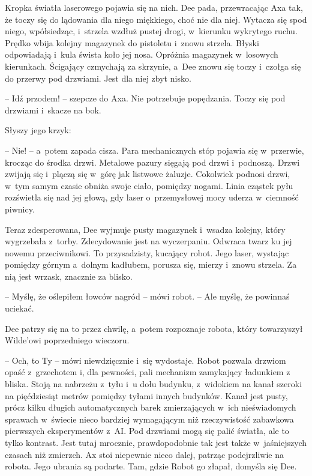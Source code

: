 \documentclass[oneside,polish,11pt,sfheadings]{mwbk}
\begin{document}
Kropka światła laserowego pojawia się na nich. Dee pada, przewracając
Axa tak, że toczy się do lądowania dla niego miękkiego, choć nie dla
niej. Wytacza się spod niego, wpółsiedząc, i~strzela wzdłuż pustej
drogi, w~kierunku wykrytego ruchu. Prędko wbija kolejny magazynek do
pistoletu i~znowu strzela. Błyski odpowiadają i~kula śwista koło jej
nosa. Opróżnia magazynek w~losowych kierunkach. Ścigający czmychają za
skrzynie, a~Dee znowu się toczy i~czołga się do przerwy pod drzwiami.
Jest dla niej zbyt nisko.

-- Idź przodem! -- szepcze do Axa. Nie potrzebuje popędzania. Toczy się
pod drzwiami i~skacze na bok.

Słyszy jego krzyk: 

-- Nie! -- a~potem zapada cisza. Para mechanicznych
stóp pojawia się w~przerwie, krocząc do środka drzwi. Metalowe pazury
sięgają pod drzwi i~podnoszą. Drzwi zwijają się i~plączą się w~górę jak
listwowe żaluzje. Cokolwiek podnosi drzwi, w~tym samym czasie obniża
swoje ciało, pomiędzy nogami. Linia cząstek pyłu rozświetla się nad jej
głową, gdy laser o~przemysłowej mocy uderza w~ciemność piwnicy.

Teraz zdesperowana, Dee wyjmuje pusty magazynek i~wsadza kolejny, który
wygrzebała z~torby. Zdecydowanie jest na wyczerpaniu. Odwraca twarz ku
jej nowemu przeciwnikowi. To przysadzisty, kucający robot. Jego laser,
wystając pomiędzy górnym a~dolnym kadłubem, porusza się, mierzy i~znowu
strzela. Za nią jest wrzask, znacznie za blisko.

-- Myślę, że oślepiłem łowców nagród -- mówi robot. -- Ale myślę, że
powinnaś uciekać.

Dee patrzy się na to przez chwilę, a~potem rozpoznaje robota, który
towarzyszył Wilde'owi poprzedniego wieczoru.

-- Och, to Ty -- mówi niewdzięcznie i~się wydostaje. Robot pozwala drzwiom
opaść z~grzechotem i, dla pewności, pali mechanizm zamykający ładunkiem
z bliska. Stoją na nabrzeżu z~tyłu i~u dołu budynku, z~widokiem na kanał
szeroki na pięćdziesiąt metrów pomiędzy tyłami innych budynków. Kanał
jest pusty, prócz kilku długich automatycznych barek zmierzających w~ich
nieświadomych sprawach w~świecie nieco bardziej wymagającym niż
rzeczywistość zabawkowa pierwszych eksperymentów z~AI. Pod drzwiami mogą
się palić światła, ale to tylko kontrast. Jest tutaj mrocznie,
prawdopodobnie tak jest także w~jaśniejszych czasach niż zmierzch. Ax
stoi niepewnie nieco dalej, patrząc podejrzliwie na robota. Jego ubrania
są podarte. Tam, gdzie Robot go złapał, domyśla się Dee.
\end{document}
